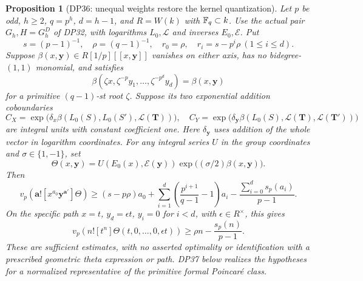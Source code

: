 \documentclass[11pt,a4paper]{article}
\newtheorem{proposition}[theorem]{Proposition}
\theoremstyle{definition}\newtheorem{remark}[theorem]{Remark}
\begin{document}
\begin{proposition}[DP36: unequal weights restore the kernel quantization]\label{DP36}
Let $p$ be odd, $h\ge2$, $q=p^h$, $d=h-1$, and $R=W(k)$ with $\mathbb F_q\subset k$. Use the actual pair $G_h,H=G_h^D$ of DP32, with logarithms $L_0,\mathcal L$ and inverses $E_0,\mathcal E$. Put
\[
 s=(p-1)^{-1},\quad\rho=(q-1)^{-1},\quad r_0=\rho,\quad r_i=s-p^i\rho\ (1\le i\le d).
\]
Suppose $\beta(x,\mathbf y)\in R[1/p][[x,\mathbf y]]$ vanishes on either axis, has no bidegree-$(1,1)$ monomial, and satisfies
\[
 \beta(\zeta x,\zeta^{-p}y_1,\ldots,\zeta^{-p^d}y_d)=\beta(x,\mathbf y)
\]
for a primitive $(q-1)$-st root $\zeta$. Suppose its two exponential addition coboundaries
\[
 C_X=\exp\bigl(\delta_x\beta(L_0(S),L_0(S'),\mathcal L(\mathbf T))\bigr),\quad
 C_Y=\exp\bigl(\delta_{\mathbf y}\beta(L_0(S),\mathcal L(\mathbf T),\mathcal L(\mathbf T'))\bigr)
\]
are integral units with constant coefficient one. Here $\delta_{\mathbf y}$ uses addition of the whole vector in logarithm coordinates. For any integral series $U$ in the group coordinates and $\sigma\in\{1,-1\}$, set
\[
 \Theta(x,\mathbf y)=U(E_0(x),\mathcal E(\mathbf y))\exp\bigl((\sigma/2)\beta(x,\mathbf y)\bigr).
\]
Then
\begin{equation}\label{eq:true-pair-weight}
 v_p(\mathbf a![x^{a_0}\mathbf y^{\mathbf a'}]\Theta)
 \ge (s-p\rho)a_0+\sum_{i=1}^d\left(\frac{p^{i+1}}{q-1}-1\right)a_i
       -\frac{\sum_{i=0}^d s_p(a_i)}{p-1}.
\end{equation}
On the specific path $x=t$, $y_d=\epsilon t$, $y_i=0$ for $i<d$, with $\epsilon\in R^\times$, this gives
\begin{equation}\label{eq:true-pair-path}
 v_p(n![t^n]\Theta(t,0,\ldots,0,\epsilon t))
 \ge\rho n-\frac{s_p(n)}{p-1}.
\end{equation}
These are sufficient estimates, with no asserted optimality or identification with a prescribed geometric theta expression or path. DP37 below realizes the hypotheses for a normalized representative of the primitive formal Poincar\'e class.
\end{proposition}
\end{document}
